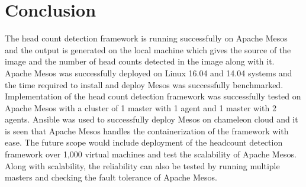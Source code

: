 \documentclass[9pt,twocolumn,twoside]{../../styles/osajnl}
\begin{document}
\section{Conclusion}
The head count detection framework is running successfully on Apache
Mesos and the output is generated on the local machine which gives the
source of the image and the number of head counts detected in the
image along with it. Apache Mesos was successfully deployed on Linux
16.04 and 14.04 systems and the time required to install and deploy
Mesos was successfully benchmarked. Implementation of the head count
detection framework was successfully tested on Apache Mesos with a
cluster of 1 master with 1 agent and 1 master with 2 agents. Ansible
was used to successfully deploy Mesos on chameleon cloud and it is
seen that Apache Mesos handles the containerization of the framework
with ease. The future scope would include deployment of the headcount
detection framework over 1,000 virtual machines and test the
scalability of Apache Mesos. Along with scalability, the reliability
can also be tested by running multiple masters and checking the fault
tolerance of Apache Mesos.



\end{document}
